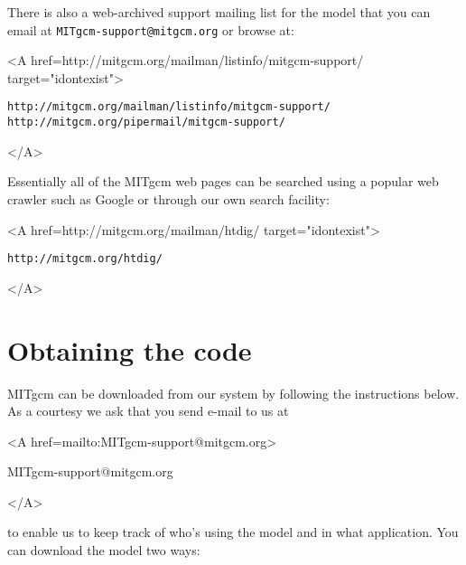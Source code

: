 There is also a web-archived support mailing list for the model that
you can email at \texttt{MITgcm-support@mitgcm.org} or browse at:
\begin{rawhtml} <A href=http://mitgcm.org/mailman/listinfo/mitgcm-support/ target="idontexist"> \end{rawhtml}
\begin{verbatim}
http://mitgcm.org/mailman/listinfo/mitgcm-support/
http://mitgcm.org/pipermail/mitgcm-support/
\end{verbatim}
\begin{rawhtml} </A> \end{rawhtml}
Essentially all of the MITgcm web pages can be searched using a
popular web crawler such as Google or through our own search facility:
\begin{rawhtml} <A href=http://mitgcm.org/mailman/htdig/ target="idontexist"> \end{rawhtml}
\begin{verbatim}
http://mitgcm.org/htdig/
\end{verbatim}
\begin{rawhtml} </A> \end{rawhtml}



\section{Obtaining the code}
\label{sect:obtainingCode}

MITgcm can be downloaded from our system by following
the instructions below. As a courtesy we ask that you send e-mail to us at
\begin{rawhtml} <A href=mailto:MITgcm-support@mitgcm.org> \end{rawhtml}
MITgcm-support@mitgcm.org
\begin{rawhtml} </A> \end{rawhtml}
to enable us to keep track of who's using the model and in what application.
You can download the model two ways:

